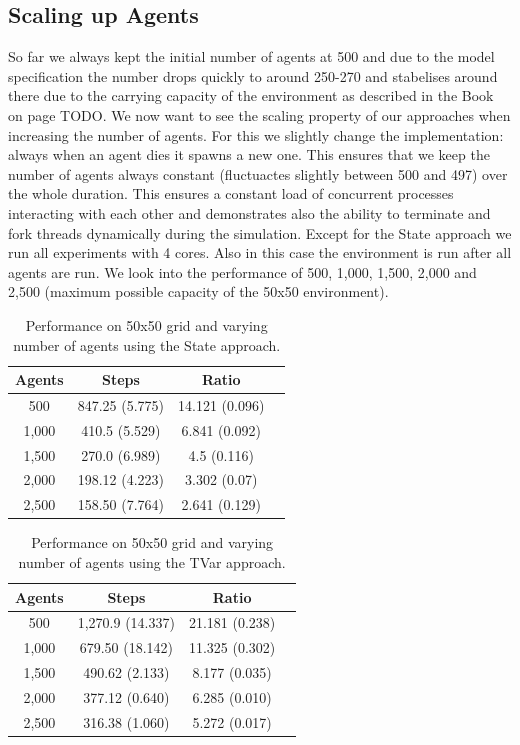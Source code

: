 \subsection{Scaling up Agents}
So far we always kept the initial number of agents at 500 and due to the model specification the number drops quickly to around 250-270 and stabelises around there due to the carrying capacity of the environment as described in the Book on page TODO. We now want to see the scaling property of our approaches when increasing the number of agents. For this we slightly change the implementation: always when an agent dies it spawns a new one. This ensures that we keep the number of agents always constant (fluctuactes slightly between 500 and 497) over the whole duration. This ensures a constant load of concurrent processes interacting with each other and demonstrates also the ability to terminate and fork threads dynamically during the simulation.
Except for the State approach we run all experiments with 4 cores. Also in this case the environment is run after all agents are run. We look into the performance of 500, 1,000, 1,500, 2,000 and 2,500 (maximum possible capacity of the 50x50 environment).

\begin{table}
	\centering
  	\begin{tabular}{ c || c | c | c }
        Agents  & Steps           & Ratio          \\ \hline \hline 
    	500     & 847.25 (5.775)  & 14.121 (0.096) \\ \hline
   		1,000   & 410.5 (5.529)   & 6.841 (0.092)  \\ \hline
   		1,500   & 270.0 (6.989)   & 4.5 (0.116)    \\ \hline
   		2,000   & 198.12 (4.223)  & 3.302 (0.07)   \\ \hline 
   		2,500   & 158.50 (7.764)  & 2.641 (0.129)  \\ \hline 
   	\end{tabular}
  	
  	\caption{Performance on 50x50 grid and varying number of agents using the State approach.}
	\label{tab:state_results_agentsscale_time}
\end{table}

\begin{table}
	\centering
  	\begin{tabular}{ c || c | c | c }
        Agents  & Steps            & Ratio          \\ \hline \hline 
    	500     & 1,270.9 (14.337) & 21.181 (0.238) \\ \hline
   		1,000   & 679.50 (18.142)  & 11.325 (0.302) \\ \hline
   		1,500   & 490.62 (2.133)   & 8.177 (0.035)  \\ \hline
   		2,000   & 377.12 (0.640)   & 6.285 (0.010)  \\ \hline 
   		2,500   & 316.38 (1.060)   & 5.272 (0.017)  \\ \hline 
   	\end{tabular}
  	
  	\caption{Performance on 50x50 grid and varying number of agents using the TVar approach.}
	\label{tab:tvar_results_agentsscale_time}
\end{table}

